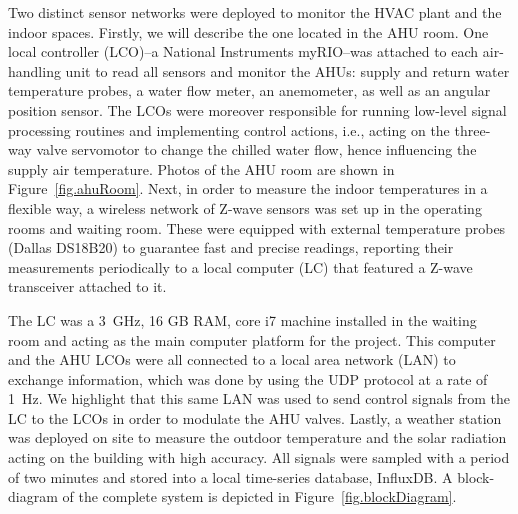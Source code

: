 Two distinct sensor networks were deployed to monitor the HVAC plant and the indoor spaces. Firstly, we will describe the one located in the AHU room. One local controller (LCO)--a National Instruments myRIO--was attached to each air-handling unit to read all sensors and monitor the AHUs: supply and return water temperature probes, a water flow meter, an anemometer, as well as an angular position sensor. The LCOs were moreover responsible for running low-level signal processing routines and implementing control actions, i.e., acting on the three-way valve servomotor to change the chilled water flow, hence influencing the supply air temperature. Photos of the AHU room are shown in Figure~\ref{fig.ahuRoom}. Next, in order to measure the indoor temperatures in a flexible way, a wireless network of Z-wave sensors was set up in the operating rooms and waiting room. These were equipped with external temperature probes (Dallas DS18B20) to guarantee fast and precise readings, reporting their measurements periodically to a local computer (LC) that featured a Z-wave transceiver attached to it.

The LC was a 3~GHz, 16 GB RAM, core i7 machine installed in the waiting room and acting as the main computer platform for the project. This computer and the AHU LCOs were all connected to a local area network (LAN) to exchange information, which was done by using the UDP protocol at a rate of 1~Hz. We highlight that this same LAN was used to send control signals from the LC to the LCOs in order to modulate the AHU valves. Lastly, a weather station was deployed on site to measure the outdoor temperature and the solar radiation acting on the building with high accuracy. All signals were sampled with a period of two minutes and stored into a local time-series database, InfluxDB. A block-diagram of the complete system is depicted in Figure~\ref{fig.blockDiagram}.  

